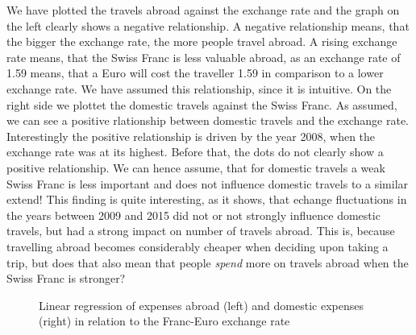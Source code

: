 \documentclass[12pt,a4paper,bibliography=totocnumbered,listof=totocnumbered]{scrartcl}
\begin{document}
We have plotted the travels abroad against the exchange rate and the graph on the left clearly shows a negative relationship. A negative relationship means, that the bigger the exchange rate, the more people travel abroad. A rising exchange rate means, that the Swiss Franc is less valuable abroad, as an exchange rate of 1.59 means, that a Euro will cost the traveller 1.59 in comparison to a lower exchange rate. We have assumed this relationship, since it is intuitive. On the right side we plottet the domestic travels against the Swiss Franc. As assumed, we can see a positive rlationship between domestic travels and the exchange rate. Interestingly the positive relationship is driven by the year 2008, when the exchange rate was at its highest. Before that, the dots do not clearly show a positive relationship. We can hence assume, that for domestic travels a weak Swiss Franc is less important and does not influence domestic travels to a similar extend! This finding is quite interesting, as it shows, that echange fluctuations in the years between 2009 and 2015 did not or not strongly influence domestic travels, but had a strong impact on number of travels abroad. This is, because travelling abroad becomes considerably cheaper when deciding upon taking a trip, but does that also mean that people \textit{spend} more on travels abroad when the Swiss Franc is stronger? 

\begin{figure}
\centering
     \qquad
\caption{Linear regression of expenses abroad (left) and domestic expenses (right) in relation to the Franc-Euro exchange rate}
\end{figure}
\end{document}
